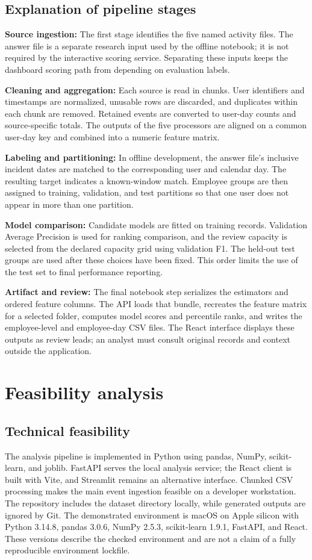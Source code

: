 \documentclass[12pt,a4paper,oneside]{report}
\begin{document}
\subsection{Explanation of pipeline stages}
\textbf{Source ingestion:} The first stage identifies the five named
activity files. The answer file is a separate research input used by
the offline notebook; it is not required by the interactive scoring
service. Separating these inputs keeps the dashboard scoring path from
depending on evaluation labels.

\textbf{Cleaning and aggregation:} Each source is read in chunks. User
identifiers and timestamps are normalized, unusable rows are discarded,
and duplicates within each chunk are removed. Retained events are
converted to user-day counts and source-specific totals. The outputs of
the five processors are aligned on a common user-day key and combined
into a numeric feature matrix.

\textbf{Labeling and partitioning:} In offline development, the answer
file's inclusive incident dates are matched to the corresponding user
and calendar day. The resulting target indicates a known-window match.
Employee groups are then assigned to training, validation, and test
partitions so that one user does not appear in more than one partition.

\textbf{Model comparison:} Candidate models are fitted on training
records. Validation Average Precision is used for ranking comparison,
and the review capacity is selected from the declared capacity grid
using validation F1. The held-out test groups are used after these
choices have been fixed. This order limits the use of the test set to
final performance reporting.

\textbf{Artifact and review:} The final notebook step serializes the
estimators and ordered feature columns. The API loads that bundle,
recreates the feature matrix for a selected folder, computes model
scores and percentile ranks, and writes the employee-level and
employee-day CSV files. The React interface displays these outputs as
review leads; an analyst must consult original records and context
outside the application.

\section{Feasibility analysis}
\subsection{Technical feasibility}
The analysis pipeline is implemented in Python using pandas, NumPy,
scikit-learn, and joblib. FastAPI serves the local analysis service; the
React client is built with Vite, and Streamlit remains an alternative
interface. Chunked CSV processing makes the main event
ingestion feasible on a developer workstation. The repository includes
the dataset directory locally, while generated outputs are ignored by
Git. The demonstrated environment is macOS on Apple silicon with Python
3.14.8, pandas 3.0.6, NumPy 2.5.3, scikit-learn 1.9.1, FastAPI, and
React. These versions describe the checked environment and are not a
claim of a fully reproducible environment lockfile.
\end{document}
